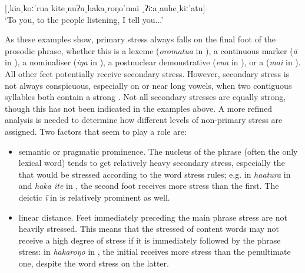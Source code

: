 [ˌkiaˌkoːˈrua  kiteˌnuʔuˌhakaˌroŋoˈmai  ˌʔiːaˌauheˌkiːˈatu]\\

\glt
‘To you, to the people listening, I tell you...’ \textstyleExampleref{[R630-04.063]}
\z

As these examples show, primary stress always falls on the final foot of the prosodic phrase, whether this is a lexeme (\textit{oromatu}\textit{{\ꞌ}}\textit{a} in ), a continuous marker (\textit{{\ꞌ}ā} in ), a nominaliser (\textit{iŋa} in ), a postnuclear demonstrative (\textit{ena} in ), or a  (\textit{mai} in ). All other feet potentially receive secondary stress. However, secondary stress is not always conspicuous, especially on or near long vowels, when two contiguous syllables both contain a strong .
Not all secondary stresses are equally strong, though this has not been indicated in the examples above. A more refined analysis is needed to determine how different levels of non-primary stress are assigned. Two factors that seem to play a role are:

\begin{itemize}
\item 
semantic or pragmatic prominence. The nucleus of the phrase (often the only lexical word) tends to get relatively heavy secondary stress, especially the  that would be stressed according to the word stress rules; e.g. in \textit{ha{\ꞌ}atura} in  and \textit{haka {\ꞌ}ite} in , the second foot receives more stress than the first. The deictic  \textit{{\ꞌ}ī} in  is relatively prominent as well.

\item 
linear distance. Feet immediately preceding the main phrase stress are not heavily stressed. This means that the stressed  of content words may not receive a high degree of stress if it is immediately followed by the phrase stress: in \textit{hakaroŋo} in , the initial  receives more stress than the penultimate one, despite the word stress on the latter.

\end{itemize}
